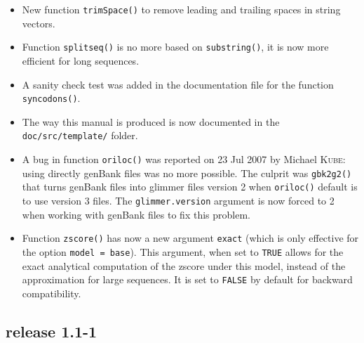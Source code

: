\documentclass{article}
\begin{document}
\begin{itemize}

\item New function \texttt{trimSpace()} to remove leading and trailing
  spaces in string vectors.

\item Function \texttt{splitseq()} is no more based on \texttt{substring()},
  it is now more efficient for long sequences.

\item A sanity check test was added in the documentation file
  for the function \texttt{syncodons()}.

\item The way this manual is produced is now documented in the
  \texttt{doc/src/template/} folder.

\item A bug in function \texttt{oriloc()} was reported on 23 Jul 2007
  by Michael \textsc{Kube}: using directly genBank files was no more possible.
  The culprit was \texttt{gbk2g2()} that turns genBank files into
  glimmer files version 2 when \texttt{oriloc()} default is to use
  version 3 files. The \texttt{glimmer.version} argument is now forced
  to 2 when working with genBank files to fix this problem.
 
\item Function \texttt{zscore()} has now a new argument
  \texttt{exact} (which is only effective for the option
  \texttt{model = base}). This argument, when set to 
  \texttt{TRUE} allows for the exact analytical computation 
  of the zscore under this model, instead of the approximation for
  large sequences. It is set to \texttt{FALSE} by
  default for backward compatibility.
\end{itemize}

\subsection*{release 1.1-1}
\end{document}
